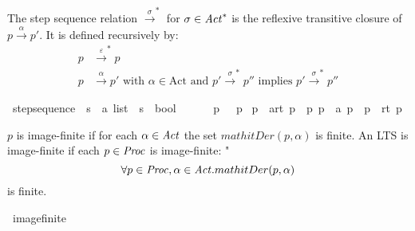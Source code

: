 \begin{isabellebody}
\begin{isamarkuptext}
The step sequence relation $\xrightarrow{\sigma}^*$ for $\sigma \in \mathit{Act}^*$ is the reflexive transitive closure of $p \xrightarrow{\alpha} p'$.
It is defined recursively by:
\begin{align*}
  p &\xrightarrow{\varepsilon}^* p \\
  p &\xrightarrow{\alpha} p' \text{ with } \alpha \in \text{Act} \text{ and } p' \xrightarrow{\sigma}^* p'' \text{ implies } p' \xrightarrow{\sigma}^* p''
\end{align*}%
\end{isamarkuptext}\isamarkuptrue%
\isamarkupfalse%
\ step{\isacharunderscore}{\kern0pt}sequence\ {\isacharcolon}{\kern0pt}{\isacharcolon}{\kern0pt}\ {\isacartoucheopen}{\isacharprime}{\kern0pt}s\ {\isasymRightarrow}\ {\isacharprime}{\kern0pt}a\ list\ {\isasymRightarrow}\ {\isacharprime}{\kern0pt}s\ {\isasymRightarrow}\ bool{\isacartoucheclose}\ {\isacharparenleft}{\kern0pt}{\isacartoucheopen}{\isacharunderscore}{\kern0pt}\ {\isasymmapsto}{\isachardollar}{\kern0pt}\ {\isacharunderscore}{\kern0pt}\ {\isacharunderscore}{\kern0pt}{\isacartoucheclose}{\isacharbrackleft}{\kern0pt}{}{}{\isacharcomma}{\kern0pt}{}{}{\isacharcomma}{\kern0pt}{}{}{\isacharbrackright}{\kern0pt}\ {}{}{\isacharparenright}{\kern0pt}\ \isanewline
{\isacartoucheopen}p\ {\isasymmapsto}{\isachardollar}{\kern0pt}\ {\isacharbrackleft}{\kern0pt}{\isacharbrackright}{\kern0pt}\ p{\isacartoucheclose}\ {\isacharbar}{\kern0pt}\isanewline
{\isacartoucheopen}p\ {\isasymmapsto}{\isachardollar}{\kern0pt}\ {\isacharparenleft}{\kern0pt}a{\isacharhash}{\kern0pt}rt{\isacharparenright}{\kern0pt}\ p{\isacharprime}{\kern0pt}{\isacharprime}{\kern0pt}{\isacartoucheclose}\ \ {\isacartoucheopen}{\isasymexists}p{\isacharprime}{\kern0pt}{\isachardot}{\kern0pt}\ p\ {\isasymmapsto}\ a\ p{\isacharprime}{\kern0pt}\ {\isasymand}\ p{\isacharprime}{\kern0pt}\ {\isasymmapsto}{\isachardollar}{\kern0pt}\ rt\ p{\isacharprime}{\kern0pt}{\isacharprime}{\kern0pt}{\isacartoucheclose}%
\begin{isamarkuptext}%
$p$ is image-finite if for each $\alpha \in \mathit{Act}$ the set $mathit{Der} (p, \alpha)$ is finite.
An LTS is image-finite if each $p \in \mathit{Proc}$ is image-finite:
"$$\forall p \in\mathit{Proc}, \alpha \in \mathit{Act}. mathit{Der} (p, \alpha)$$ is finite.%
\end{isamarkuptext}\isamarkuptrue%
\isamarkupfalse%
\ image{\isacharunderscore}{\kern0pt}finite\ \isanewline

\end{isabellebody}

